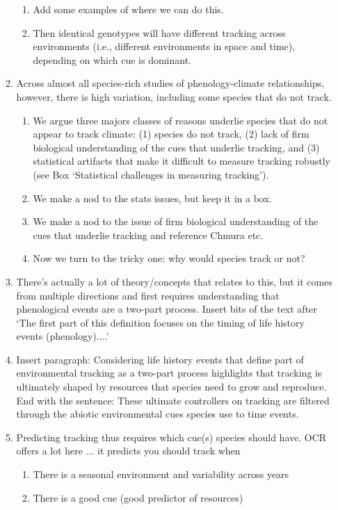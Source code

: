 \documentclass[11pt,letterpaper]{article}
\begin{document}
\begin{enumerate}
\begin{enumerate}
\begin{enumerate}
\item Add some examples of where we can do this.
\item Then identical genotypes will have different tracking across environments (i.e., different environments in space and time), depending on which cue is dominant. 
\end{enumerate}
\item Across almost all species-rich studies of phenology-climate relationships, however, there is high variation, including some species that do not track. 
\begin{enumerate}
\item We argue three majors classes of reasons underlie species that do not appear to track climate: (1) species do not track, (2) lack of firm biological understanding of the cues that underlie tracking, and (3) statistical artifacts that make it difficult to measure tracking robustly (see Box `Statistical challenges in measuring tracking'). 
\item We make a nod to the stats issues, but keep it in a box.
\item We make a nod to the issue of firm biological understanding of the cues that underlie tracking and reference Chmura etc.
\item Now we turn to the tricky one: why would species track or not?
\end{enumerate}
\item There's actually a lot of theory/concepts that relates to this, but it comes from multiple directions and first requires understanding that phenological events are a two-part process. Insert bits of the text after `The first part of this definition focuses on the timing of life history events (phenology)....'
\item Insert paragraph: Considering life history events that define part of environmental tracking as a two-part process highlights that tracking is ultimately shaped by resources that species need to grow and reproduce. End with the sentence: These ultimate controllers on tracking are filtered through the abiotic environmental cues species use to time events.  
\item Predicting tracking thus requires which cue(s) species should have. OCR offers a lot here ... it predicts you should track when
\begin{enumerate}
\item There is a seasonal environment and variability across years
\item There is a good cue (good predictor of resources)

\end{enumerate}
\end{enumerate}
\end{enumerate}
\end{document}
